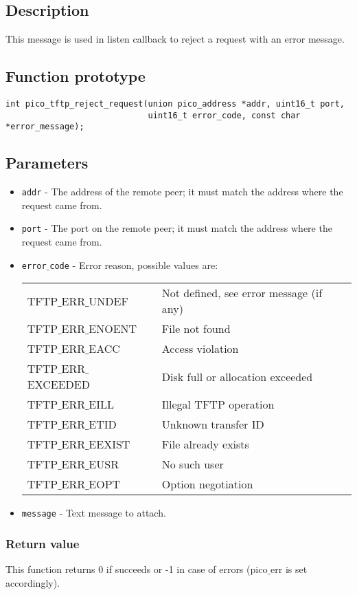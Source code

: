 \subsection*{Description}
This message is used in listen callback to reject a request with an error message.
\subsection*{Function prototype}
\begin{verbatim}
int pico_tftp_reject_request(union pico_address *addr, uint16_t port,
                             uint16_t error_code, const char *error_message);
\end{verbatim}

\subsection*{Parameters}
\begin{itemize}[noitemsep]
\item \texttt{addr} - The address of the remote peer; it must match the address where the request came from.
\item \texttt{port} - The port on the remote peer; it must match the address where the request came from.
\item \texttt{error$\_$code} - Error reason, possible values are:

\begin{tabular}{ll}
TFTP$\_$ERR$\_$UNDEF & Not defined, see error message (if any) \\
TFTP$\_$ERR$\_$ENOENT & File not found \\
TFTP$\_$ERR$\_$EACC & Access violation \\
TFTP$\_$ERR$\_$EXCEEDED & Disk full or allocation exceeded \\
TFTP$\_$ERR$\_$EILL & Illegal TFTP operation \\
TFTP$\_$ERR$\_$ETID & Unknown transfer ID \\
TFTP$\_$ERR$\_$EEXIST & File already exists \\
TFTP$\_$ERR$\_$EUSR & No such user \\
TFTP$\_$ERR$\_$EOPT & Option negotiation \\
\end{tabular}
\item \texttt{message} - Text message to attach.
\end{itemize}

\subsubsection*{Return value}
This function returns 0 if succeeds or -1 in case of errors (pico$\_$err is set accordingly).

